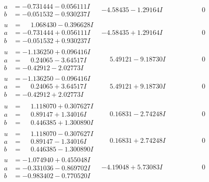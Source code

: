 \documentclass[1p]{elsarticle_modified}
\theoremstyle{definition}
\begin{document}
$$\begin{array}{c|c|c}
\begin{aligned}
a &= -0.731444 - 0.056111 I \\
b &= -0.051532 - 0.930237 I\end{aligned}
 & -4.58435 - 1.29164 I & \phantom{-0.000000 } 0 \\ \hline\begin{aligned}
u &= \phantom{-}1.068430 - 0.396628 I \\
a &= -0.731444 + 0.056111 I \\
b &= -0.051532 + 0.930237 I\end{aligned}
 & -4.58435 + 1.29164 I & \phantom{-0.000000 } 0 \\ \hline\begin{aligned}
u &= -1.136250 + 0.096416 I \\
a &= \phantom{-}0.24065 - 3.64517 I \\
b &= -0.42912 - 2.02773 I\end{aligned}
 & \phantom{-}5.49121 - 9.18730 I & \phantom{-0.000000 } 0 \\ \hline\begin{aligned}
u &= -1.136250 - 0.096416 I \\
a &= \phantom{-}0.24065 + 3.64517 I \\
b &= -0.42912 + 2.02773 I\end{aligned}
 & \phantom{-}5.49121 + 9.18730 I & \phantom{-0.000000 } 0 \\ \hline\begin{aligned}
u &= \phantom{-}1.118070 + 0.307627 I \\
a &= \phantom{-}0.89147 + 1.34016 I \\
b &= \phantom{-}0.446385 + 1.300890 I\end{aligned}
 & \phantom{-}0.16831 - 2.74248 I & \phantom{-0.000000 } 0 \\ \hline\begin{aligned}
u &= \phantom{-}1.118070 - 0.307627 I \\
a &= \phantom{-}0.89147 - 1.34016 I \\
b &= \phantom{-}0.446385 - 1.300890 I\end{aligned}
 & \phantom{-}0.16831 + 2.74248 I & \phantom{-0.000000 } 0 \\ \hline\begin{aligned}
u &= -1.074940 + 0.455048 I \\
a &= -0.331036 - 0.869702 I \\
b &= -0.983402 - 0.770520 I\end{aligned}
 & -4.19048 + 5.73083 I & \phantom{-0.000000 } 0\\

\end{array}$$
\end{document}
